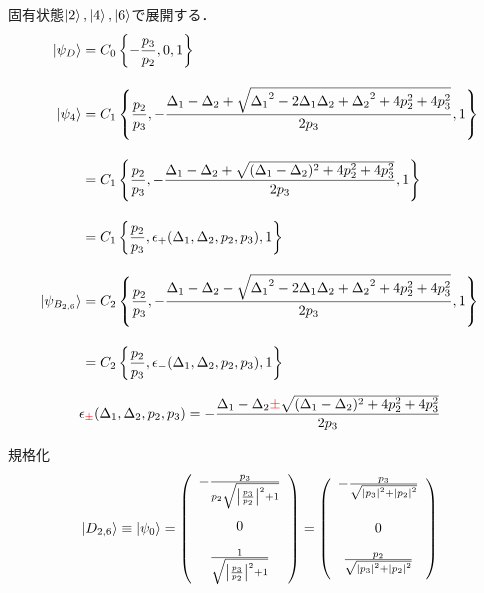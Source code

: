 固有状態$\ket{2}, \ket{4}, \ket{6}$で展開する．
\begin{align}
    \ket{\psi_D}&=C_0\left\{-\frac{{p_{3}}}{{p_{2}}},0,1\right\}\\[10pt]
    \ket{\psi_4}&=C_1\left\{\frac{{p_{2}}}{{p_{3}}},-\frac{{\Delta_{1}}-{\Delta_{2}}+\sqrt{{\Delta_{1}}^2-2{\Delta_{1}}{\Delta_{2}}+{\Delta_{2}}^2+4p_2^2+4p_3^2}}{2{p_{3}}},1\right\}\nn[10pt]
    &=C_1\left\{\frac{{p_{2}}}{{p_{3}}},-\frac{{\Delta_{1}}-{\Delta_{2}}
    +\sqrt{({\Delta_{1}}-{\Delta_{2}})^2+4p_2^2+4p_3^2}}{2{p_{3}}},1\right\}\nn[10pt]
    &=C_1\left\{\frac{{p_{2}}}{{p_{3}}},
    \epsilon_+({\Delta_{1}},{\Delta_{2}},
    p_2,p_3)
    ,1\right\}\\[10pt]
    \ket{\psi_{B_{2,6}}}&=C_2\left\{\frac{{p_{2}}}{{p_{3}}},-\frac{{\Delta_{1}}-{\Delta_{2}}-\sqrt{{\Delta_{1}}^2-2{\Delta_{1}}{\Delta_{2}}+{\Delta_{2}}^2+4p_2^2+4p_3^2}}{2{p_{3}}},1\right\}\nn[10pt]
    &=C_2\left\{\frac{{p_{2}}}{{p_{3}}},
    \epsilon_-({\Delta_{1}},{\Delta_{2}},p_2,p_3)
    ,1\right\}
\end{align}

\begin{align}
    \epsilon_{\textcolor{red}{\pm}}({\Delta_{1}},{\Delta_{2}},
    p_2,p_3)
    =-\frac{{\Delta_{1}}-{\Delta_{2}}
    \textcolor{red}{\pm}\sqrt{({\Delta_{1}}-{\Delta_{2}})^2+4p_2^2+4p_3^2}}{2{p_{3}}}
\end{align}


規格化
\begin{equation}
        \ket{D_{2,6}}\equiv\ket{\psi_0}
        =\left(
        \begin{array}{c}
       -\frac{{p_3}}{{p_2}\sqrt{\left|\frac{{p_3}}{{p_2}}\right|^2+1}}\\[20pt]
       0\\[10pt]
       \frac{1}{\sqrt{\left|\frac{{p_3}}{{p_2}}\right|^2+1}}\\[10pt]
        \end{array}
        \right)
        =\left(
        \begin{array}{c}
       -\frac{{p_3}}{\sqrt{\left|{{p_3}}\right|^2+\left|{{p_2}}\right|^2}}\\[20pt]
       0\\[10pt]
       \frac{{p_2}}{\sqrt{\left|{{p_3}}\right|^2+\left|{{p_2}}\right|^2}}\\[10pt]
        \end{array}
        \right)
\end{equation}


